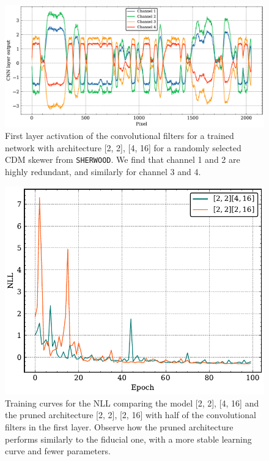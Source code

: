 \begin{figure}
    \centering
    \includegraphics[width=0.9\linewidth]{img/ML/filter-acti.pdf}
    \caption{First layer activation of the convolutional filters for a trained network with architecture [2, 2], [4, 16] for a randomly selected CDM skewer from \texttt{SHERWOOD}. We find that channel 1 and 2 are highly redundant, and similarly for channel 3 and 4.}
    \label{fig: filter acti}
\end{figure}

\begin{figure}
    \centering
    \includegraphics[width=0.9\linewidth]{img/ML/NLL_diff_channels.pdf}
    \caption{Training curves for the NLL comparing the model [2, 2], [4, 16] and the pruned architecture [2, 2], [2, 16] with half of the convolutional filters in the first layer. Observe how the pruned architecture performs similarly to the fiducial one, with a more stable learning curve and fewer parameters.}
    \label{fig: pruned NLL}
\end{figure}